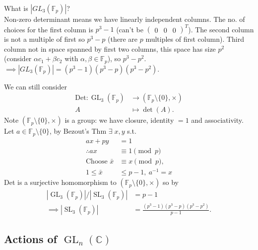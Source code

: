 What is $|GL_3(\mathbb{F}_p)|$? \\
Non-zero determinant means we have linearly independent columns.
The no. of choices for the first column is $p^3 - 1$ (can't be $\begin{pmatrix}0 & 0 & 0\end{pmatrix}^T$).
The second column is not a multiple of first so $p^3 - p$ (there are $p$ multiples of first column).
Third column not in space spanned by first two columns, this space has size $p^2$ (consider $\alpha c_1 + \beta c_2$ with $\alpha, \beta \in \mathbb{F}_p$), so $p^3 - p^2$. \\
$\implies |GL_3(\mathbb{F}_p)| = (p^3 - 1)(p^3 - p)(p^3 - p^2)$.

We can still consider 
\begin{align*}
    \mathrm{Det} : \operatorname{GL}_3(\mathbb{F}_p) &\to (\mathbb{F}_p \setminus \{0\}, \times) \\
    A &\mapsto \det(A).
\end{align*} 
Note $(\mathbb{F}_p \setminus \{0\}, \times)$ is a group: we have closure, identity $= 1$ and associativity.
Let $a \in \mathbb{F}_p \setminus \{0\}$, by Bezout's Thm $\exists \; x, y$ s.t.
\begin{align*}
    ax + py &= 1 \\
    \therefore ax &\equiv 1 \pmod p \\
    \text{Choose } \bar{x} &\equiv x \pmod p, \\
    1 \leq \bar{x} &\leq p - 1,\ a^{-1} = x
\end{align*} 
Det is a surjective homomorphism to $(\mathbb{F}_p \setminus \{0\}, \times)$ so by 
\begin{align*}
    |\operatorname{GL}_3(\mathbb{F}_p)| / |\operatorname{SL}_3(\mathbb{F}_p)| &= p - 1 \\
    \implies |\operatorname{SL}_3(\mathbb{F}_p)| &= \frac{(p^3 - 1)(p^3 - p)(p^3 - p^2)}{p - 1}.
\end{align*} 

\subsection{Actions of \texorpdfstring{$\operatorname{GL}_n(\mathbb{C})$}{GLₙ(ℂ)}}

